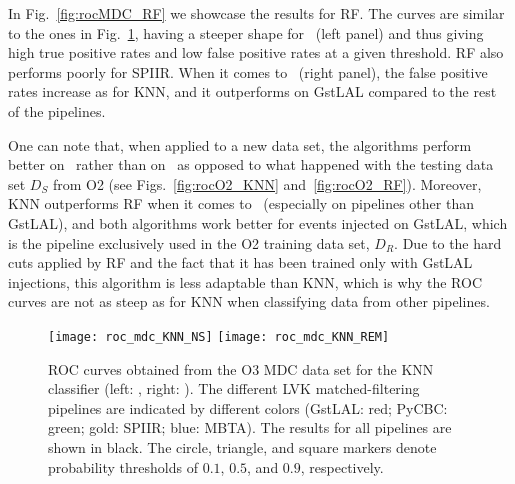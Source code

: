 In Fig.~\ref{fig:rocMDC_RF} we showcase the results for \ac{RF}.  The curves
are similar to the ones in Fig.~\ref{fig:rocMDC_KNN}, having a steeper shape for \hasns\ (left panel) and thus giving high true positive rates and low false positive rates at a given threshold. \ac{RF} also performs poorly for SPIIR. When it comes to \hasrem\ (right panel), the false positive rates increase as for \ac{KNN}, and it outperforms on GstLAL compared to the rest of the pipelines.  

One can note that, when applied to a new data set, the algorithms perform better on \hasns\ rather than on \hasrem\, as opposed to what happened with the testing data set $D_S$ from O2 (see Figs.~\ref{fig:rocO2_KNN} and~\ref{fig:rocO2_RF}). Moreover, \ac{KNN} outperforms \ac{RF} when it comes to \hasrem\ (especially on pipelines other than GstLAL), and both algorithms work better for events injected on GstLAL, which is the pipeline exclusively used in the O2 training data set, $D_R$. Due to the hard cuts applied by \ac{RF} and the fact that it has been trained only with GstLAL injections, this algorithm is less adaptable than \ac{KNN}, which is why the ROC curves are not as steep as for \ac{KNN} when classifying data from other pipelines. 


\begin{figure}%
\texttt{[image: roc\_mdc\_KNN\_NS]}
\texttt{[image: roc\_mdc\_KNN\_REM]}
\caption{\ac{ROC} curves obtained from the \ac{O3} \ac{MDC} data set for the \ac{KNN} classifier (left: \hasns, right: \hasrem). The different \ac{LVK} matched-filtering pipelines are indicated by different colors (GstLAL: red; PyCBC: green; gold: SPIIR; blue: MBTA). The results for all pipelines are shown in black. The circle, triangle, and square markers denote probability thresholds of $0.1$, $0.5$, and $0.9$, respectively.}
\label{fig:rocMDC_KNN}
\end{figure}


